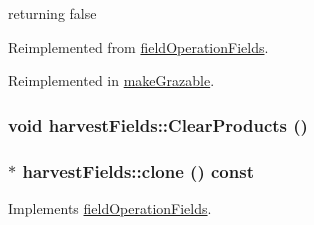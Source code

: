 returning false 

Reimplemented from \hyperlink{classfield_operation_fields_aeb2bce9d4612033dbab366d870e432a6}{fieldOperationFields}.

Reimplemented in \hyperlink{classmake_grazable_ae09405366070332941b95c92b334c6c1}{makeGrazable}.\hypertarget{classharvest_fields_a283ca8cf777ec3a4fab5122cc827492f}{
\subsubsection[{ClearProducts}]{\setlength{\rightskip}{0pt plus 5cm}void harvestFields::ClearProducts ()}}
\label{classharvest_fields_a283ca8cf777ec3a4fab5122cc827492f}
\hypertarget{classharvest_fields_aa252f8782663a14d3ccefff889279b36}{
\subsubsection[{clone}]{ $\ast$ harvestFields::clone () const}}
\label{classharvest_fields_aa252f8782663a14d3ccefff889279b36}


Implements \hyperlink{classfield_operation_fields_ae5d8585b7e57196ce3801eed29677b3e}{fieldOperationFields}.

